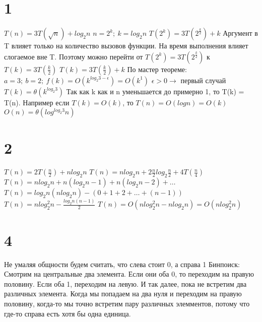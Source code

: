 \documentclass[12pt]{extarticle}
\begin{document}
\section*{1}
$T(n) = 3T(\sqrt{n}) + log_2 n$ \newline
$n = 2^k;\ k = log_2 n$ \newline
$T(2^k) = 3T(2^{\frac{k}{2}}) + k$ \newline
Аргумент в T влияет только на количество вызовов функции. На время выполнения влияет слогаемое вне T. Поэтому можно перейти от $T(2^k) = 3T(2^{\frac{k}{2}})$ к $T(k) = 3T(\frac{k}{2})$ \newline
$T(k) = 3T(\frac{k}{2}) + k$ \newline
По мастер теореме: \newline
$a = 3;\ b = 2;\ f(k) = O(k^{log_2 3 - \epsilon}) = O(k^1)$ \newline
$\epsilon > 0 \rightarrow$ первый случай \newline
$T(k) = \theta(k^{log_2 3})$ \newline
Так как k как и n уменьшается до примерно 1, то T(k) = T(n). Например если $T(k) = O(k)$, то $T(n) = O(logn) = O(k)$\newline
$O(n) = \theta(log^{log_2 3}n)$

\section*{2}
$T(n) = 2T(\frac{n}{2}) + nlog_2 n$ \newline
$T(n) = nlog_2 n + 2\frac{n}{2}log_2 \frac{n}{2} + 4T(\frac{n}{4})$\newline
$T(n) = nlog_2 n + n(log_2 n - 1) + n(log_2 n - 2) + \dots$\newline
$T(n) = log_2 n (nlog_2 n) - (0 + 1 + 2 + \dots + (n-1))$\newline
$T(n) = n log_2^2 n - \frac{log_2 n (n-1)}{2}$\newline
$T(n) = O(nlog_2^2 n - nlog_2 n) = O(nlog_2^2 n)$



\section*{4}
Не умаляя общности будем считать, что слева стоит 0, а справа 1\newline
Бинпоиск: \newline
Смотрим на центральные два элемента. Если они оба 0, то переходим на правую половину. Если оба 1, переходим на левую. И так далее, пока не встретим два различных элемента.\newline
Когда мы попадаем на два нуля и переходим на правую половину, когда-то мы точно встретим пару различных элемментов, потому что где-то справа есть хотя бы одна единица.
\end{document}
